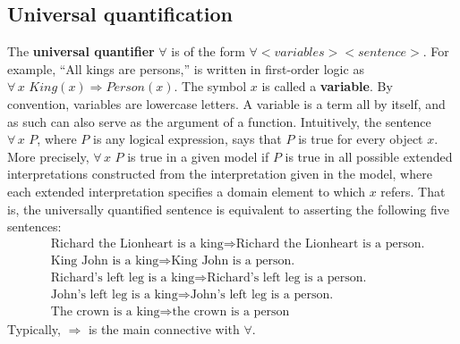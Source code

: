 \subsection{Universal quantification}
The \textbf{universal quantifier} $\forall$ is of the form $\forall <variables><sentence>$. For example, “All kings are persons,” is written in first-order logic as $\forall\, x \,\, King(x) \Rightarrow Person(x)$. The symbol $x$ is called a \textbf{variable}. By convention, variables are lowercase letters. A variable is a term all by itself, and as such can also serve as the argument of a function.\newline\newline
Intuitively, the sentence $\forall \,x\,\, P$, where $P$ is any logical expression, says that $P$ is true for every object $x$. More precisely, $\forall\, x \,\, P$ is true in a given model if $P$ is true in all possible extended interpretations constructed from the interpretation given in the model, where each extended interpretation specifies a domain element to which $x$ refers. That is, the universally quantified sentence is equivalent to asserting the following five sentences:
\[
\begin{split}
    & \text{Richard the Lionheart is a king} \Rightarrow \text{Richard the Lionheart is a person.}\\
    & \text{King John is a king} \Rightarrow \text{King John is a person.}\\
    & \text{Richard’s left leg is a king} \Rightarrow \text{Richard’s left leg is a person.}\\
    & \text{John’s left leg is a king} \Rightarrow \text{John’s left leg is a person.}\\
    & \text{The crown is a king} \Rightarrow \text{the crown is a person}
\end{split}
\]
Typically, $\Rightarrow$ is the main connective with $\forall$.

